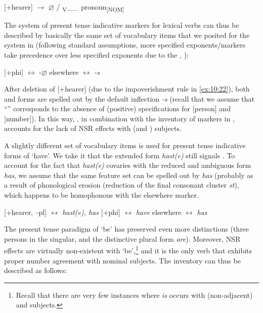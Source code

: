 \documentclass[output=paper]{langsci/langscibook}
\begin{document}
\ea\label{ex:10:22}
\mbox{[+hearer]} {$\rightarrow$ $\varnothing$} / \textsubscript{V}\_\_\ pronoun\textsubscript{[NOM]}
\z

The system of present tense indicative markers for lexical verbs can thus be
described by basically the same set of vocabulary items that we posited for the
system in  (following standard assumptions, more
specified exponents/markers take precedence over less specified exponents due
to the , \citealt{Kiparsky:1973}):

\ea \label{ex:10:23}
\ea \mbox{[+phi]} $\leftrightarrow$ -$\varnothing$
\ex elsewhere $\leftrightarrow$ \emph{-s}
\z
\z

After deletion of [+hearer] (due to the impoverishment rule in \ref{ex:10:22}), both
\Ssg{} and \Tsg{} forms are spelled out by the default inflection \emph{-s}
(recall that we assume that ``\Tsg{}'' corresponds to the absence of (positive)
specifications for [person] and [number]). In this way, , in combination
with the inventory of  markers in , accounts for the lack of
\gls{NSR} effects with \Ssg{} (and \Tsg{}) subjects.

A slightly different set of vocabulary items is used for present tense
indicative forms of `have'. We take it that the extended form \emph{hast(e)}
still signals \Ssg{}. To account for the fact that \emph{hast(e)} covaries with
the reduced and ambiguous form \emph{has}, we assume that the same feature set
can be spelled out by \emph{has} (probably as a result of phonological erosion
(reduction of the final consonant cluster \emph{st}), which happens to be
homophonous with the elsewhere marker.%

\ea
\ea \mbox{[+hearer, -pl]} $\leftrightarrow$ \emph{hast(e), has}
\ex \mbox{[+phi]} $\leftrightarrow$ \emph{have}
\ex elsewhere $\leftrightarrow$ \emph{has}
\z
\z

The present tense paradigm of `be' has preserved even more distinctions (three
persons in the singular, and the distinctive plural form \emph{are}). Moreover,
\gls{NSR} effects are virtually non-existent with `be',\footnote{Recall that
    there are very few instances where \emph{is} occurs with (non-adjacent)
    \Fsg{} and \Ssg{} subjects.} and it is the only verb that exhibits proper
    number agreement with nominal subjects. The
    inventory can thus be described as follows:
\end{document}
